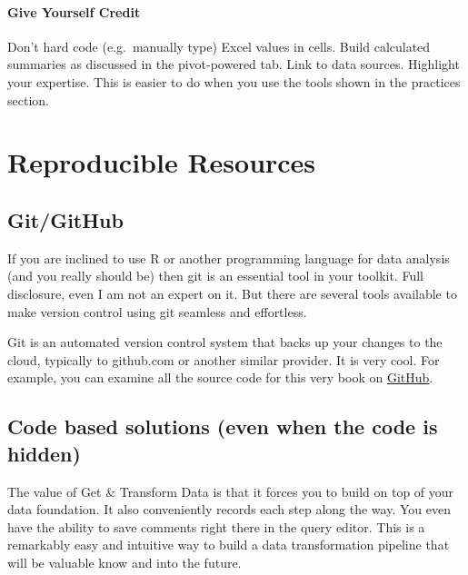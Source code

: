 \documentclass[
]{book}
\begin{document}
\hypertarget{give-yourself-credit}{%
\paragraph{Give Yourself Credit}\label{give-yourself-credit}}

Don't hard code (e.g.~manually type) Excel values in cells. Build calculated summaries as discussed in the pivot-powered tab. Link to data sources. Highlight your expertise. This is easier to do when you use the tools shown in the practices section.

\hypertarget{reproducible-resources}{%
\section{Reproducible Resources}\label{reproducible-resources}}

\hypertarget{gitgithub}{%
\subsection{Git/GitHub}\label{gitgithub}}

If you are inclined to use R or another programming language for data analysis (and you really should be) then git is an essential tool in your toolkit. Full disclosure, even I am not an expert on it. But there are several tools available to make version control using git seamless and effortless.

Git is an automated version control system that backs up your changes to the cloud, typically to github.com or another similar provider. It is very cool. For example, you can examine all the source code for this very book on \href{https://github.com/nemethc/dataisfordemocracy/tree/master/doingdemocraticdataanalysis}{GitHub}.

\hypertarget{code-based-solutions-even-when-the-code-is-hidden}{%
\subsection{Code based solutions (even when the code is hidden)}\label{code-based-solutions-even-when-the-code-is-hidden}}

The value of Get \& Transform Data is that it forces you to build on top of your data foundation. It also conveniently records each step along the way. You even have the ability to save comments right there in the query editor. This is a remarkably easy and intuitive way to build a data transformation pipeline that will be valuable know and into the future.
\end{document}

